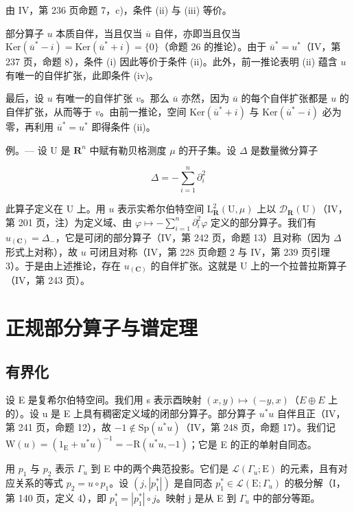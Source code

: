 由 IV，第 236 页命题 7，c)，条件 (ii) 与 (iii) 等价。

部分算子 \(u\) 本质自伴，当且仅当 \(\overline{u}\) 自伴，亦即当且仅当 \(\text{Ker}(\overline{u}^* - i) = \text{Ker}(\overline{u}^* + i) = \{0\}\)（命题 26 的推论）。由于 \(\overline{u}^* = u^*\)（IV，第 237 页，命题 8），条件 (i) 因此等价于条件 (ii)。此外，前一推论表明 (ii) 蕴含 \(u\) 有唯一的自伴扩张，此即条件 (iv)。

最后，设 \(u\) 有唯一的自伴扩张 \(v\)。那么 \(\overline{u}\) 亦然，因为 \(\overline{u}\) 的每个自伴扩张都是 \(u\) 的自伴扩张，从而等于 \(v\)。由前一推论，空间 \(\mathrm{Ker}(\overline{u}^{*} + i)\) 与 \(\mathrm{Ker}(\overline{u}^{*} - i)\) 必为零，再利用 \(\overline{u}^{*} = u^{*}\) 即得条件 (ii)。

例。--- 设 U 是 \(\mathbf{R}^{n}\) 中赋有勒贝格测度 \(\mu\) 的开子集。设 \(\Delta\) 是数量微分算子

\[
\Delta = - \sum_ {i = 1} ^ {n} \partial_ {i} ^ {2}
\]

此算子定义在 U 上。用 \(u\) 表示实希尔伯特空间 \(\mathrm{L}_{\mathbf{R}}^{2}(\mathrm{U},\mu)\) 上以 \(\mathcal{D}_{\mathbf{R}}(\mathrm{U})\)（IV，第 201 页，注）为定义域、由 \(\varphi \mapsto -\sum_{i=1}^{n}\partial_{i}^{2}\varphi\) 定义的部分算子。我们有 \(u_{(\mathbf{C})} = \Delta_{-}\)，它是可闭的部分算子（IV，第 242 页，命题 13）且对称（因为 \(\Delta\) 形式上对称），故 \(u\) 可闭且对称（IV，第 228 页命题 2 与 IV，第 239 页引理 3）。于是由上述推论，存在 \(u_{(\mathbf{C})}\) 的自伴扩张。这就是 U 上的一个拉普拉斯算子（IV，第 243 页）。

\section{正规部分算子与谱定理}

\subsection{有界化}

设 E 是复希尔伯特空间。我们用 s 表示酉映射 \((x,y)\mapsto(-y,x)\)（\(E\oplus E\) 上的）。设 u 是 E 上具有稠密定义域的闭部分算子。部分算子 \(u^{*}u\) 自伴且正（IV，第 241 页，命题 12），故 \(-1\notin\mathrm{Sp}(u^{*}u)\)（IV，第 248 页，命题 17）。我们记 \(\mathrm{W}(u)=(1_{\mathrm{E}}+u^{*}u)^{-1}=-\mathrm{R}(u^{*}u,-1)\)；它是 E 的正的单射自同态。

用 \(p_{1}\) 与 \(p_{2}\) 表示 \(\Gamma_{u}\) 到 E 中的两个典范投影。它们是 \(\mathcal{L}(\Gamma_{u};\mathrm{E})\) 的元素，且有对应关系的等式 \(p_{2}=u\circ p_{1}\)。设 \((j,|p_{1}^{*}|)\) 是自同态 \(p_{1}^{*}\in\mathcal{L}(\mathrm{E};\Gamma_{u})\) 的极分解（I，第 140 页，定义 4），即 \(p_{1}^{*}=|p_{1}^{*}|\circ j\)。映射 j 是从 E 到 \(\Gamma_{u}\) 中的部分等距。

